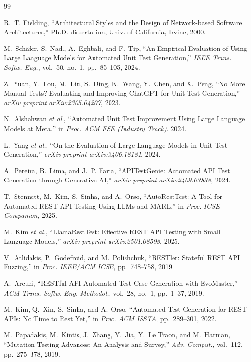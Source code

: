 \documentclass[sigconf,review,anonymous=false]{acmart}
\begin{document}

\begin{thebibliography}{99}

R.~T. Fielding,
``Architectural Styles and the Design of Network-based Software Architectures,''
Ph.D. dissertation, Univ. of California, Irvine, 2000.

M.~Sch\"{a}fer, S.~Nadi, A.~Eghbali, and F.~Tip,
``An Empirical Evaluation of Using Large Language Models for Automated Unit Test
Generation,''
\textit{IEEE Trans. Softw. Eng.}, vol.~50, no.~1, pp.~85--105, 2024.

Z.~Yuan, Y.~Lou, M.~Liu, S.~Ding, K.~Wang, Y.~Chen, and X.~Peng,
``No More Manual Tests? Evaluating and Improving ChatGPT for Unit Test
Generation,''
\textit{arXiv preprint arXiv:2305.04207}, 2023.

N.~Alshahwan \textit{et al.},
``Automated Unit Test Improvement Using Large Language Models at Meta,''
in \textit{Proc. ACM FSE (Industry Track)}, 2024.

L.~Yang \textit{et al.},
``On the Evaluation of Large Language Models in Unit Test Generation,''
\textit{arXiv preprint arXiv:2406.18181}, 2024.

A.~Pereira, B.~Lima, and J.~P. Faria,
``APITestGenie: Automated API Test Generation through Generative AI,''
\textit{arXiv preprint arXiv:2409.03838}, 2024.

T.~Stennett, M.~Kim, S.~Sinha, and A.~Orso,
``AutoRestTest: A Tool for Automated REST API Testing Using LLMs and MARL,''
in \textit{Proc. ICSE Companion}, 2025.

M.~Kim \textit{et al.},
``LlamaRestTest: Effective REST API Testing with Small Language Models,''
\textit{arXiv preprint arXiv:2501.08598}, 2025.

V.~Atlidakis, P.~Godefroid, and M.~Polishchuk,
``RESTler: Stateful REST API Fuzzing,''
in \textit{Proc. IEEE/ACM ICSE}, pp.~748--758, 2019.

A.~Arcuri,
``RESTful API Automated Test Case Generation with EvoMaster,''
\textit{ACM Trans. Softw. Eng. Methodol.}, vol.~28, no.~1, pp.~1--37, 2019.

M.~Kim, Q.~Xin, S.~Sinha, and A.~Orso,
``Automated Test Generation for REST APIs: No Time to Rest Yet,''
in \textit{Proc. ACM ISSTA}, pp.~289--301, 2022.

M.~Papadakis, M.~Kintis, J.~Zhang, Y.~Jia, Y.~Le Traon, and M.~Harman,
``Mutation Testing Advances: An Analysis and Survey,''
\textit{Adv. Comput.}, vol.~112, pp.~275--378, 2019.





\end{thebibliography}
\end{document}

